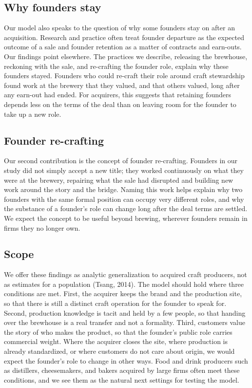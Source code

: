 \documentclass[12pt]{article}
\begin{document}
\subsection{Why founders stay}

Our model also speaks to the question of why some founders stay on after an acquisition. Research and practice often treat founder departure as the expected outcome of a sale and founder retention as a matter of contracts and earn-outs. Our findings point elsewhere. The practices we describe, releasing the brewhouse, reckoning with the sale, and re-crafting the founder role, explain why these founders stayed. Founders who could re-craft their role around craft stewardship found work at the brewery that they valued, and that others valued, long after any earn-out had ended. For acquirers, this suggests that retaining founders depends less on the terms of the deal than on leaving room for the founder to take up a new role.

\subsection{Founder re-crafting}

Our second contribution is the concept of founder re-crafting. Founders in our study did not simply accept a new title; they worked continuously on what they were at the brewery, repairing what the sale had disrupted and building new work around the story and the bridge. Naming this work helps explain why two founders with the same formal position can occupy very different roles, and why the substance of a founder's role can change long after the deal terms are settled. We expect the concept to be useful beyond brewing, wherever founders remain in firms they no longer own.

\subsection{Scope}

We offer these findings as analytic generalization to acquired craft producers, not as estimates for a population (Tsang, 2014). The model should hold where three conditions are met. First, the acquirer keeps the brand and the production site, so that there is still a distinct craft operation for the founder to speak for. Second, production knowledge is tacit and held by a few people, so that handing over the brewhouse is a real transfer and not a formality. Third, customers value the story of who makes the product, so that the founder's public role carries commercial weight. Where the acquirer closes the site, where production is already standardized, or where customers do not care about origin, we would expect the founder's role to change in other ways. Food and drink producers such as distillers, cheesemakers, and bakers acquired by large firms often meet these conditions, and we see them as the natural next settings for testing the model.
\end{document}
